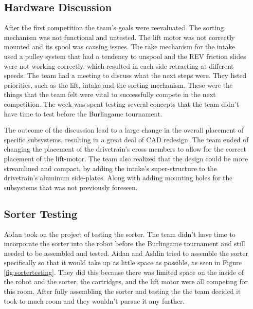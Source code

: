 \documentclass{article}
\begin{document}
\subsection{Hardware Discussion}
After the first competition the team's goals were reevaluated. The sorting mechanism was not functional and untested. The lift motor was not correctly mounted and its spool was causing issues. The rake mechanism for the intake used a pulley system that had a tendency to unspool and the REV friction slides were not working correctly, which resulted in each side retracting at different speeds. The team had a meeting to discuss what the next steps were. They listed priorities, such as the lift, intake and the sorting mechanism. These were the things that the team felt were vital to successfully compete in the next competition. The week was spent testing several concepts that the team didn't have time to test before the Burlingame tournament. 

The outcome of the discussion lead to a large change in the overall placement of specific subsystems, resulting in a great deal of CAD redesign. The team ended of changing the placement of the drivetrain's cross members to allow for the correct placement of the lift-motor. The team also realized that the design could be more streamlined and compact, by adding the intake's super-structure to the drivetrain's aluminum side-plates. Along with adding mounting holes for the subsystems that was not previously foreseen.  


\subsection{Sorter Testing}
Aidan took on the project of testing the sorter. The team didn't have time to incorporate the sorter into the robot before the Burlingame tournament and still needed to be assembled and tested. Aidan and Ashlin tried to assemble the sorter specifically so that it would take up as little space as possible, as seen in Figure \ref{fig:sortertesting}. They did this because there was limited space on the inside of the robot and the sorter, the cartridges, and the lift motor were all competing for this room. After fully assembling the sorter and testing the the team decided it took to much room and they wouldn't pursue it any further.
\end{document}
